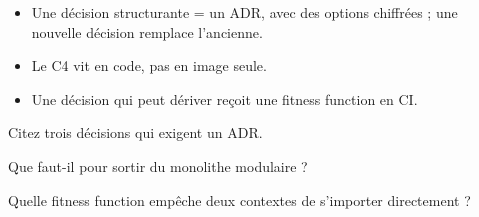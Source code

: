 \begin{retenir}[À retenir]
\begin{itemize}
  \item Une décision structurante = un ADR, avec des options chiffrées ; une nouvelle décision remplace l'ancienne.
  \item Le C4 vit en code, pas en image seule.
  \item Une décision qui peut dériver reçoit une fitness function en CI.
\end{itemize}
\end{retenir}

\begin{acquis}
  \item Citez trois décisions qui exigent un ADR.
  \item Que faut-il pour sortir du monolithe modulaire ?
  \item Quelle fitness function empêche deux contextes de s'importer directement ?
\end{acquis}
